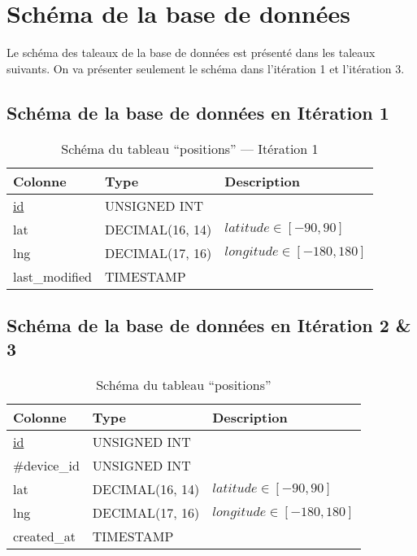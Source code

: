 \chapter{Schéma de la base de données}

Le schéma des taleaux de la base de données est présenté dans les taleaux
suivants. On va présenter seulement le schéma dans l'itération 1 et l'itération
3.

\section{Schéma de la base de données en Itération 1}
\label{sec:sprint1-database}

\begin{table}[H]
   \centering
   \begin{tabular}{|l|p{4cm}|p{8cm}|}
   \hline
   \textbf{Colonne} & \textbf{Type} & \textbf{Description} \\
   \hline
   \underline{id} & UNSIGNED INT &\\ \hline
   lat & DECIMAL(16, 14) &$latitude \in [-90, 90]$ \\ \hline
   lng & DECIMAL(17, 16) & $longitude \in [-180, 180]$\\ \hline
   last\_modified & TIMESTAMP & \\ \hline
   \end{tabular}
   \caption{Schéma du tableau ``positions'' --- Itération 1}
\end{table}

\section{Schéma de la base de données en Itération 2 \& 3}
\label{sec:sprint3-database}

\begin{table}[H]
   \centering
   \begin{tabular}{|l|p{4cm}|p{8cm}|}
   \hline
   \textbf{Colonne} & \textbf{Type} & \textbf{Description} \\
   \hline
   \underline{id} & UNSIGNED INT &\\ \hline
   \#device\_id & UNSIGNED INT &\\ \hline
   lat & DECIMAL(16, 14) &$latitude \in [-90, 90]$ \\ \hline
   lng & DECIMAL(17, 16) & $longitude \in [-180, 180]$\\ \hline
   created\_at & TIMESTAMP & \\ \hline
   \end{tabular}
   \caption{Schéma du tableau ``positions''}
\end{table}

